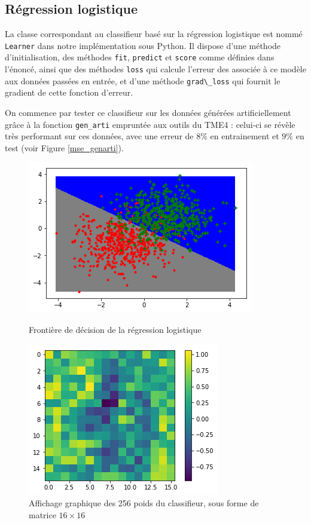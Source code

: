 \documentclass[a4paper]{article}
\begin{document}
\subsection*{Régression logistique}

La classe correspondant au classifieur basé sur la régression logistique est nommé \verb!Learner! dans notre implémentation sous Python. Il dispose d'une méthode d'initialisation, des méthodes \verb!fit!, \verb!predict! et \verb!score! comme définies dans l'énoncé, ainsi que des méthodes \verb!loss! qui calcule l'erreur des associée à ce modèle aux données passées en entrée, et d'une méthode \verb!grad\_loss! qui fournit le gradient de cette fonction d'erreur.

On commence par tester ce classifieur sur les données générées artificiellement grâce à la fonction \verb!gen_arti! empruntée aux outils du TME4 : celui-ci se révèle très performant sur ces données, avec une erreur de $8\%$ en entrainement et $9\%$ en test (voir Figure \ref{mse_genarti}).

\begin{figure}[ht!]
\begin{center}
\begin{minipage}{0.45\textwidth}
\includegraphics[scale=0.5]{mse_genarti.png}
\caption{Frontière de décision de la régression logistique}
\label{mse_genarti}
\end{minipage}\hfill
\begin{minipage}{0.45\textwidth}
\includegraphics[scale=0.5]{weights_usps.png}
\caption{Affichage graphique des 256 poids du classifieur, sous forme de matrice $16 \times 16$}
\label{weights_usps}
\end{minipage}
\end{center}
\end{figure}
\end{document}
